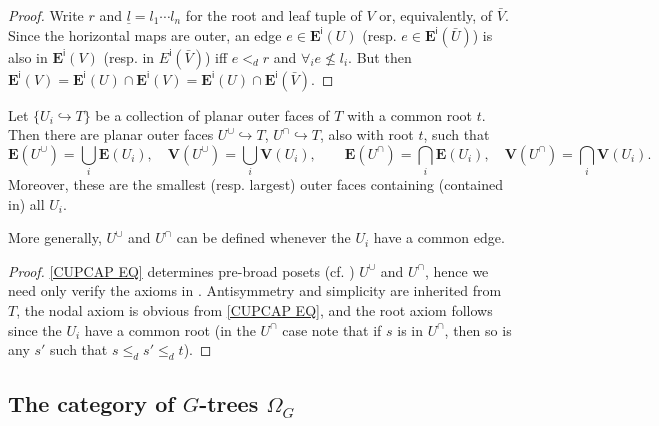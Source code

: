 \documentclass[a4paper,10pt
]{article}%
\begin{document}
\begin{proof}
	Write $r$ and $\underline{l}=l_1\cdots l_n$
	for the root and leaf tuple of $V$ or, equivalently, of $\bar{V}$.
	Since the horizontal maps are outer, an edge
	$e \in \boldsymbol{E}^{\mathsf{i}}(U)$ 
	(resp. $e \in \boldsymbol{E}^{\mathsf{i}}(\bar{U})$)
	is also in $\boldsymbol{E}^{\mathsf{i}}(V)$ (resp. in $E^{\mathsf{i}}(\bar{V})$) iff
	$e <_d r$ and $\forall_i e \not \leq l_i$.
	But then 
	$\boldsymbol{E}^{\mathsf{i}}(V) =
	\boldsymbol{E}^{\mathsf{i}}(U) \cap 
	\boldsymbol{E}^{\mathsf{i}}(V) =
	\boldsymbol{E}^{\mathsf{i}}(U) \cap
	\boldsymbol{E}^{\mathsf{i}}(\bar{V})$. 
\end{proof}


\begin{lemma}\label{CUPCAP LEM}
	Let $\{U_i \hookrightarrow T\}$ be a collection of planar outer faces of $T$ with a common root $t$. Then there are planar outer faces
	$U^{\cup} \hookrightarrow T$, $U^{\cap} \hookrightarrow T$,
	also with root $t$, such that
\begin{equation}\label{CUPCAP EQ}
	\boldsymbol{E}(U^{\cup}) = \bigcup_i \boldsymbol{E}(U_i), \quad
	\boldsymbol{V}(U^{\cup}) = \bigcup_i \boldsymbol{V}(U_i), \qquad
	\boldsymbol{E}(U^{\cap}) = \bigcap_i \boldsymbol{E}(U_i), \quad
	\boldsymbol{V}(U^{\cap}) = \bigcap_i \boldsymbol{V}(U_i).
\end{equation}
Moreover, these are the smallest (resp. largest) outer faces
containing (contained in) all $U_i$.
\end{lemma}

\begin{remark}
	More generally, $U^{\cup}$ and $U^{\cap}$
	can be defined whenever the $U_i$ have a common edge.
\end{remark}

\begin{proof}
	\eqref{CUPCAP EQ} determines pre-broad posets 
	(cf. \cite[Rem. 5.2]{Per17}) $U^{\cup}$ and $U^{\cap}$,
	hence we need only verify the axioms in 
	\cite[Defs. 5.1, 5.3, 5.9]{Per17}. 
	Antisymmetry and simplicity are inherited from $T$, the nodal axiom is obvious from \eqref{CUPCAP EQ}, and the root axiom follows since the $U_i$ have a common root (in the $U^{\cap}$ case note that if $s$ is in $U^{\cap}$, then so is any $s'$ such that
	$s \leq_d s' \leq_d t$).
\end{proof}


\subsection{The category of $G$-trees $\Omega_G$}
\end{document}
